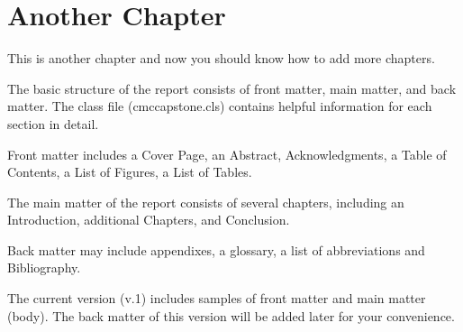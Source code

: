 \chapter{Another Chapter}\label{Ch:another_chapter}

This is another chapter and now you should know how to add more chapters.

The basic structure of the report consists of front matter, main matter, and back matter. The class file (cmccapstone.cls) contains helpful information for each section in detail.

Front matter includes a Cover Page, an Abstract, Acknowledgments, a Table of Contents,
a List of Figures, a List of Tables.

The main matter of the report consists of several chapters, including an Introduction,
additional Chapters, and Conclusion.

Back matter may include appendixes, a glossary, a list of abbreviations and Bibliography.

The current version (v.1) includes samples of front matter and main matter (body). The back matter of this version will be added later for your convenience.

\endinput